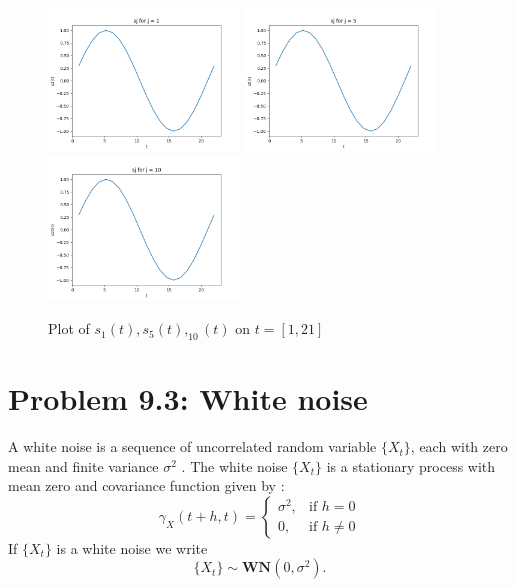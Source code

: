 \documentclass[11pt, oneside]{article}   	%
\begin{document}
\begin{figure}[H] %
   \centering
   \includegraphics[width=2in]{sj1} 
    \includegraphics[width=2in]{sj5} 
     \includegraphics[width=2in]{sj10} 
   \caption{Plot of $s_{1}(t), s_{5}(t), _{10}(t)$ on $t=[1,21]$}
   \label{fig:sj}
\end{figure}


\section{Problem 9.3: White noise}
A white noise is a sequence of uncorrelated random variable $\{ X_{t} \}$, each with zero mean and finite variance $\sigma^{2}$ \cite{petter}. The white noise $\{ X_{t} \}$ is a stationary process with mean zero and covariance function given by \cite{petter}:
\begin{equation}
    \gamma_{X}(t+h,t)= 
\begin{cases}
    \sigma^{2},& \text{if } h=0\\
    0,              & \text{if } h \neq 0
\end{cases}
\end{equation}
If $\{ X_{t} \}$ is a white noise we write
\begin{equation}
\{ X_{t} \} \sim \textbf{WN}(0,\sigma^{2}).
\end{equation}
%
\end{document}

